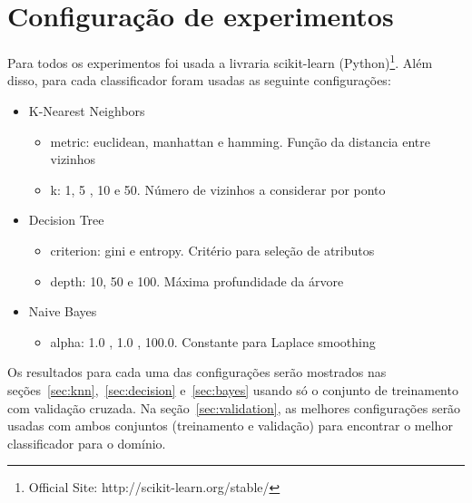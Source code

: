 \section{Configuração de experimentos}
\label{sec:setup}

Para todos os experimentos foi usada a livraria scikit-learn (Python)\footnote{Official Site: http://scikit-learn.org/stable/}. Além disso, para cada classificador foram usadas as seguinte configurações:
\begin{itemize}
	\item K-Nearest Neighbors
	\begin{itemize}
		\item metric: euclidean, manhattan e hamming. Função da distancia entre vizinhos
		\item k: 1, 5 , 10 e 50. Número de vizinhos a considerar por ponto
	\end{itemize}
	\item Decision Tree
	\begin{itemize}
		\item criterion: gini e entropy. Critério para seleção de atributos
		\item depth: 10, 50 e 100. Máxima profundidade da árvore
	\end{itemize}
	\item Naive Bayes
	\begin{itemize}
		\item alpha: 1.0 , 1.0 , 100.0. Constante para Laplace smoothing
	\end{itemize}
\end{itemize}

Os resultados para cada uma das configurações serão mostrados nas seções~\ref{sec:knn},~\ref{sec:decision} e~\ref{sec:bayes} usando só o conjunto de treinamento com validação cruzada. Na seção~\ref{sec:validation}, as melhores configurações serão usadas com ambos conjuntos (treinamento e validação) para encontrar o melhor classificador para o domínio.